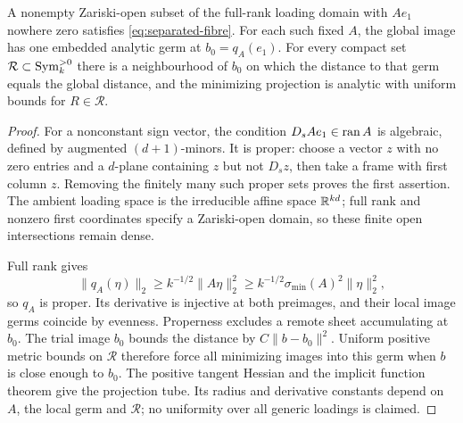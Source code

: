 \begin{lemma}\label{lem:global}
A nonempty Zariski-open subset of the full-rank loading domain with $Ae_1$ nowhere zero satisfies \eqref{eq:separated-fibre}. For each such fixed $A$, the global image has one embedded analytic germ at $b_0=q_A(e_1)$. For every compact set $\mathcal R\subset\operatorname{Sym}_k^{>0}$ there is a neighbourhood of $b_0$ on which the distance to that germ equals the global distance, and the minimizing projection is analytic with uniform bounds for $R\in\mathcal R$.
\end{lemma}
\begin{proof}
For a nonconstant sign vector, the condition $D_sAe_1\in\operatorname{ran} A$ is algebraic, defined by augmented $(d+1)$-minors. It is proper: choose a vector $z$ with no zero entries and a $d$-plane containing $z$ but not $D_sz$, then take a frame with first column $z$. Removing the finitely many such proper sets proves the first assertion. The ambient loading space is the irreducible affine space $\mathbb R^{kd}$; full rank and nonzero first coordinates specify a Zariski-open domain, so these finite open intersections remain dense.

Full rank gives
\[
 \|q_A(\eta)\|_2\ge k^{-1/2}\|A\eta\|_2^2
                   \ge k^{-1/2}\sigma_{\min}(A)^2\|\eta\|_2^2,
\]
so $q_A$ is proper. Its derivative is injective at both preimages, and their local image germs coincide by evenness. Properness excludes a remote sheet accumulating at $b_0$. The trial image $b_0$ bounds the distance by $C\|b-b_0\|^2$. Uniform positive metric bounds on $\mathcal R$ therefore force all minimizing images into this germ when $b$ is close enough to $b_0$. The positive tangent Hessian and the implicit function theorem give the projection tube. Its radius and derivative constants depend on $A$, the local germ and $\mathcal R$; no uniformity over all generic loadings is claimed.
\end{proof}

